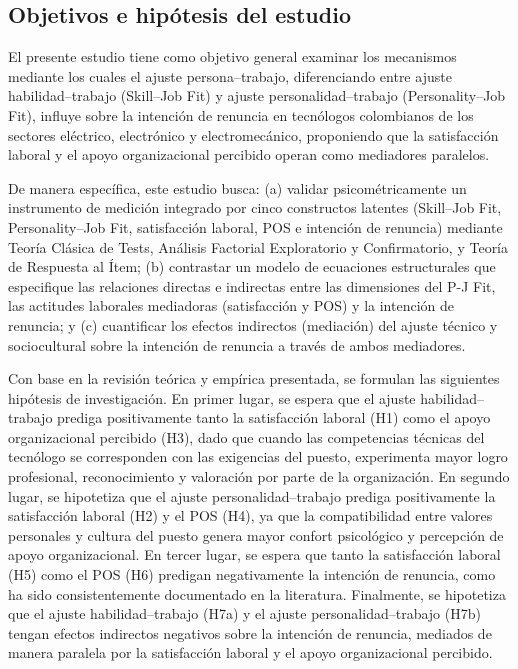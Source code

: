 \subsection{Objetivos e hipótesis del estudio}

El presente estudio tiene como objetivo general examinar los mecanismos mediante los cuales el ajuste persona--trabajo, diferenciando entre ajuste habilidad--trabajo (Skill--Job Fit) y ajuste personalidad--trabajo (Personality--Job Fit), influye sobre la intención de renuncia en tecnólogos colombianos de los sectores eléctrico, electrónico y electromecánico, proponiendo que la satisfacción laboral y el apoyo organizacional percibido operan como mediadores paralelos.

De manera específica, este estudio busca: (a) validar psicométricamente un instrumento de medición integrado por cinco constructos latentes (Skill--Job Fit, Personality--Job Fit, satisfacción laboral, POS e intención de renuncia) mediante Teoría Clásica de Tests, Análisis Factorial Exploratorio y Confirmatorio, y Teoría de Respuesta al Ítem; (b) contrastar un modelo de ecuaciones estructurales que especifique las relaciones directas e indirectas entre las dimensiones del P-J Fit, las actitudes laborales mediadoras (satisfacción y POS) y la intención de renuncia; y (c) cuantificar los efectos indirectos (mediación) del ajuste técnico y sociocultural sobre la intención de renuncia a través de ambos mediadores.

Con base en la revisión teórica y empírica presentada, se formulan las siguientes hipótesis de investigación. En primer lugar, se espera que el ajuste habilidad--trabajo prediga positivamente tanto la satisfacción laboral (H1) como el apoyo organizacional percibido (H3), dado que cuando las competencias técnicas del tecnólogo se corresponden con las exigencias del puesto, experimenta mayor logro profesional, reconocimiento y valoración por parte de la organización. En segundo lugar, se hipotetiza que el ajuste personalidad--trabajo prediga positivamente la satisfacción laboral (H2) y el POS (H4), ya que la compatibilidad entre valores personales y cultura del puesto genera mayor confort psicológico y percepción de apoyo organizacional. En tercer lugar, se espera que tanto la satisfacción laboral (H5) como el POS (H6) predigan negativamente la intención de renuncia, como ha sido consistentemente documentado en la literatura. Finalmente, se hipotetiza que el ajuste habilidad--trabajo (H7a) y el ajuste personalidad--trabajo (H7b) tengan efectos indirectos negativos sobre la intención de renuncia, mediados de manera paralela por la satisfacción laboral y el apoyo organizacional percibido.

